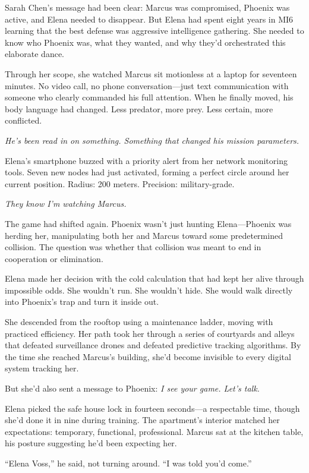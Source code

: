 Sarah Chen's message had been clear: Marcus was compromised, Phoenix was active, and Elena needed to disappear. But Elena had spent eight years in MI6 learning that the best defense was aggressive intelligence gathering. She needed to know who Phoenix was, what they wanted, and why they'd orchestrated this elaborate dance.

Through her scope, she watched Marcus sit motionless at a laptop for seventeen minutes. No video call, no phone conversation---just text communication with someone who clearly commanded his full attention. When he finally moved, his body language had changed. Less predator, more prey. Less certain, more conflicted.

\emph{He's been read in on something. Something that changed his mission parameters.}

Elena's smartphone buzzed with a priority alert from her network monitoring tools. Seven new nodes had just activated, forming a perfect circle around her current position. Radius: 200 meters. Precision: military-grade.

\emph{They know I'm watching Marcus.}

The game had shifted again. Phoenix wasn't just hunting Elena---Phoenix was herding her, manipulating both her and Marcus toward some predetermined collision. The question was whether that collision was meant to end in cooperation or elimination.

Elena made her decision with the cold calculation that had kept her alive through impossible odds. She wouldn't run. She wouldn't hide. She would walk directly into Phoenix's trap and turn it inside out.

She descended from the rooftop using a maintenance ladder, moving with practiced efficiency. Her path took her through a series of courtyards and alleys that defeated surveillance drones and defeated predictive tracking algorithms. By the time she reached Marcus's building, she'd become invisible to every digital system tracking her.

But she'd also sent a message to Phoenix: \emph{I see your game. Let's talk.}

Elena picked the safe house lock in fourteen seconds---a respectable time, though she'd done it in nine during training. The apartment's interior matched her expectations: temporary, functional, professional. Marcus sat at the kitchen table, his posture suggesting he'd been expecting her.

``Elena Voss,'' he said, not turning around. ``I was told you'd come.''

